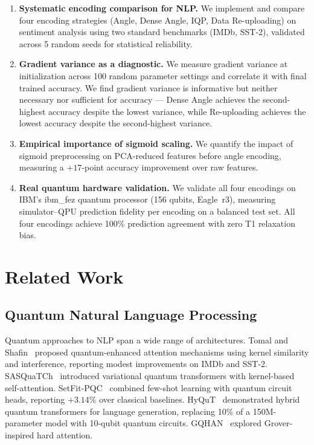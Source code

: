\documentclass[conference,onecolumn,11pt]{IEEEtran}
\begin{document}
\begin{enumerate}
\item \textbf{Systematic encoding comparison for NLP.} We implement and compare four encoding strategies (Angle, Dense Angle, IQP, Data Re-uploading) on sentiment analysis using two standard benchmarks (IMDb, SST-2), validated across 5 random seeds for statistical reliability.

\item \textbf{Gradient variance as a diagnostic.} We measure gradient variance at initialization across 100 random parameter settings and correlate it with final trained accuracy. We find gradient variance is informative but neither necessary nor sufficient for accuracy --- Dense Angle achieves the second-highest accuracy despite the lowest variance, while Re-uploading achieves the lowest accuracy despite the second-highest variance.

\item \textbf{Empirical importance of sigmoid scaling.} We quantify the impact of sigmoid preprocessing on PCA-reduced features before angle encoding, measuring a $+17$-point accuracy improvement over raw features.

\item \textbf{Real quantum hardware validation.} We validate all four encodings on IBM's ibm\_fez quantum processor (156 qubits, Eagle~r3), measuring simulator--QPU prediction fidelity per encoding on a balanced test set. All four encodings achieve 100\% prediction agreement with zero T1 relaxation bias.
\end{enumerate}

\section{Related Work}

\subsection{Quantum Natural Language Processing}

Quantum approaches to NLP span a wide range of architectures. Tomal and Shafin~\cite{tomal2025} proposed quantum-enhanced attention mechanisms using kernel similarity and interference, reporting modest improvements on IMDb and SST-2. SASQuaTCh~\cite{sasquatch} introduced variational quantum transformers with kernel-based self-attention. SetFit-PQC~\cite{setfit_pqc} combined few-shot learning with quantum circuit heads, reporting $+3.14\%$ over classical baselines. HyQuT~\cite{hyqut} demonstrated hybrid quantum transformers for language generation, replacing 10\% of a 150M-parameter model with 10-qubit quantum circuits. GQHAN~\cite{gqhan} explored Grover-inspired hard attention.
\end{document}
